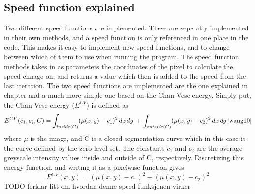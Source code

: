 \subsection{Speed function explained}
Two different speed functions are implemented. These are seperatly implemented in their own methods, and a speed function is only referenced in one place in the code. This makes it easy to implement new speed functions, and to change between which of them to use when running the program. The speed function methods takes in as parameters the coordinates of the pixel to calculate the speed chnage on, and returns a value which then is added to the speed from the last iteration. The two speed functions are implemented are the one explained in chapter \label{levelSetChap} and a much more simple one based on the Chan-Vese energy. Simply put, the Chan-Vese energy ($E^{CV}$) is defined as 
\begin{equation}
E^{CV}(c_1,c_2,C) = \int_{inside(C)} (\mu (x,y) - c_1)^2 \, dx \, dy \, + \, \int_{outside(C)} (\mu (x,y) - c_2)^2 \, dx \, dy \, \cite{wang10} %
\end{equation}
where $\mu$ is the image, and C is a closed segmentation curve which in this case is the curve defined by the zero level set. The constants $c_1$ and $c_2$ are the average greyscale intensity values inside and outside of C, respectively. Discretizing this energy function, and writing it as a pixelwise function gives
\begin{equation}
E^{CV}(x,y) = (\mu (x,y) - c_1)^2 - (\mu (x,y) - c_2)^2
\end{equation}
TODO forklar litt om hvordan denne speed funksjonen virker

